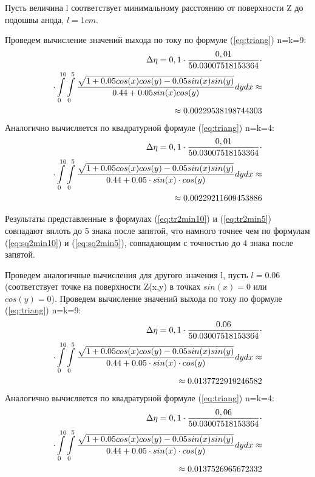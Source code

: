 \documentclass{article}
\begin{document}
Пусть величина l соответствует минимальному расстоянию от поверхности Z до подошвы анода, $l=1 cm$.

Проведем вычисление значений выхода по току по формуле (\ref{eq:triang}) n=k=9:
\begin{align}\label{eq:tr2min10}
\Delta \eta = 0,1 \cdot \frac{0,01}{50.03007518153364} \cdot \notag \\
\cdot \int\limits_0^{10} \int\limits_0^5 \frac{\sqrt{1+0.05cos(x)cos(y)-0.05sin(x)sin(y)}}{0.44 + 0.05sin(x)cos(y)} dy dx \approx \notag \\ \approx 0.00229538198744303
\end{align}\label{eq:tr2min5}
Аналогично вычисляется по квадратурной формуле (\ref{eq:triang}) n=k=4:
\begin{align}
\Delta \eta = 0,1 \cdot \frac{0,01}{50.03007518153364}  \cdot \notag \\
\cdot \int\limits_0^{10} \int\limits_0^5 \frac{\sqrt{1+0.05cos(x)cos(y)-0.05sin(x)sin(y)}}{0.44 + 0.05 \cdot sin(x) \cdot cos(y)} dy dx \approx \notag \\ \approx 0.00229211609453886
\end{align}

Результаты представленные в формулах (\ref{eq:tr2min10}) и (\ref{eq:tr2min5}) совпадают вплоть до 5 знака после запятой, что намного точнее чем по формулам (\ref{eq:sq2min10}) и (\ref{eq:sq2min5}), совпадающим с точностью до 4 знака после запятой.

Проведем аналогичные вычисления для другого значения l, пусть $l=0.06$ (соответствует точке на поверхности Z(x,y) в точках $sin(x)=0$ или $cos(y)=0$).
Проведем вычисление значений выхода по току по формуле (\ref{eq:triang}) n=k=9:
\begin{align}\label{eq:tr2med10}
\Delta \eta = 0,1 \cdot \frac{0.06}{50.03007518153364} \cdot \notag \\
\cdot \int\limits_0^{10} \int\limits_0^5 \frac{\sqrt{1+0.05cos(x)cos(y)-0.05 sin(x)sin(y)}}{0.44 + 0.05 \cdot sin(x) \cdot cos(y)} dy dx \approx \notag \\ \approx 0.0137722919246582
\end{align}
Аналогично вычисляется по квадратурной формуле (\ref{eq:triang}) n=k=4:
\begin{align}\label{eq:tr2med5}
\Delta \eta = 0,1 \cdot \frac{0,06}{50.03007518153364} \cdot \notag \\
\cdot \int\limits_0^{10} \int\limits_0^5 \frac{\sqrt{1+0.05cos(x)cos(y)-0.05 sin(x)sin(y)}}{0.44 + 0.05 \cdot sin(x) \cdot cos(y)} dy dx \approx \notag \\ \approx 0.0137526965672332
\end{align}
\end{document}
